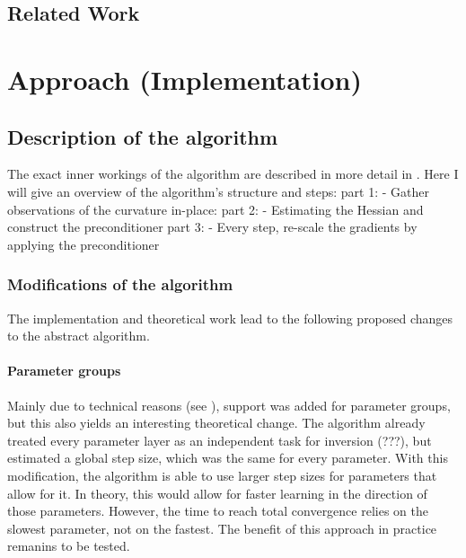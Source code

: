 \documentclass[twoside,12pt,a4paper]{report}
\begin{document}
\section{Related Work}


\chapter{Approach (Implementation)}
\section{Description of the algorithm}
The exact inner workings of the algorithm are described in more detail in \cite{roos2019active}.
Here I will give an overview of the algorithm's structure and steps:
part 1: - Gather observations of the curvature in-place:
part 2: - Estimating the Hessian and construct the preconditioner
part 3: - Every step, re-scale the gradients by applying the preconditioner

\subsection{Modifications of the algorithm}
The implementation and theoretical work lead to the following proposed changes to the abstract algorithm.
\subsubsection{Parameter groups}
Mainly due to technical reasons (see ), support was added for parameter groups, but this also yields an interesting theoretical change. The algorithm already treated every parameter layer as an independent task for inversion (???), but estimated a global step size, which was the same for every parameter. With this modification, the algorithm is able to use larger step sizes for parameters that allow for it. In theory, this would allow for faster learning in the direction of those parameters. However, the time to reach total convergence relies on the slowest parameter, not on the fastest. The benefit of this approach in practice remanins to be tested.
\end{document}
